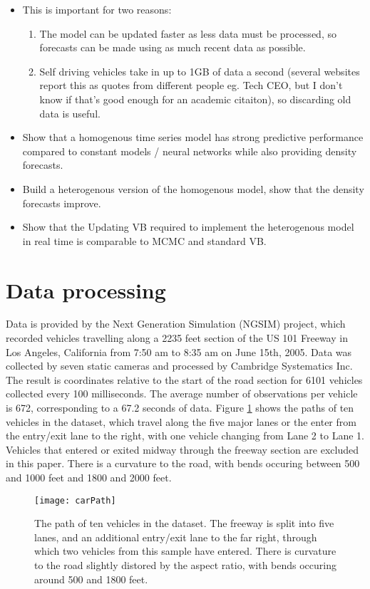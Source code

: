 \documentclass[12pt,a4paper]{article}\usepackage[]{graphicx}\usepackage[]{color}
\begin{document}
\begin{itemize}
\item This is important for two reasons:
\begin{enumerate}
\item The model can be updated faster as less data must be processed, so forecasts can be made using as much recent data as possible.
\item Self driving vehicles take in up to 1GB of data a second (several websites report this as quotes from different people eg. Tech CEO, but I don't know if that's good enough for an academic citaiton), so discarding old data is useful.
\end{enumerate}
\item Show that a homogenous time series model has strong predictive performance compared to constant models / neural networks while also providing density forecasts.
\item Build a heterogenous version of the homogenous model, show that the density forecasts improve. 
\item Show that the Updating VB required to implement the heterogenous model in real time is comparable to MCMC and standard VB.
\end{itemize}

\section{Data processing}
\label{sec:dataProcessing}
Data is provided by the Next Generation Simulation (NGSIM) project, which recorded vehicles travelling along a 2235 feet section of the US 101 Freeway in Los Angeles, California from 7:50 am to 8:35 am on June 15th, 2005. Data was collected by seven static cameras and processed by Cambridge Systematics Inc. The result is coordinates relative to the start of the road section for 6101 vehicles collected every 100 milliseconds. The average number of observations per vehicle is 672, corresponding to a 67.2 seconds of data.
Figure \ref{fig:rawData} shows the paths of ten vehicles in the dataset, which travel along the five major lanes or the enter from the entry/exit lane to the right, with one vehicle changing from Lane 2 to Lane 1. Vehicles that entered or exited midway through the freeway section are excluded in this paper. There is a curvature to the road, with bends occuring between 500 and 1000 feet and 1800 and 2000 feet.

\begin{figure}
\centering
\texttt{[image: carPath]}
\caption{The path of ten vehicles in the dataset. The freeway is split into five lanes, and an additional entry/exit lane to the far right, through which two vehicles from this sample have entered. There is curvature to the road slightly distored by the aspect ratio, with bends occuring around 500 and 1800 feet.}
\label{fig:rawData}
\end{figure}
\end{document}

